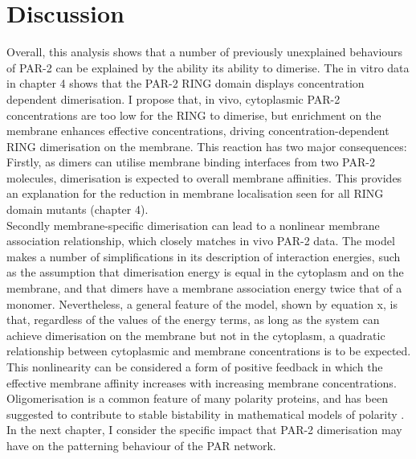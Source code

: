 \documentclass[12pt]{"report"}
\begin{document}
\section{Discussion}

Overall, this analysis shows that a number of previously unexplained behaviours of PAR-2 can be explained by the ability its ability to dimerise. The in vitro data in chapter 4 shows that the PAR-2 RING domain displays concentration dependent dimerisation. I propose that, in vivo, cytoplasmic PAR-2 concentrations are too low for the RING to dimerise, but enrichment on the membrane enhances effective concentrations, driving concentration-dependent RING dimerisation on the membrane. This reaction has two major consequences:\\

Firstly, as dimers can utilise membrane binding interfaces from two PAR-2 molecules, dimerisation is expected to overall membrane affinities. This provides an explanation for the reduction in membrane localisation seen for all RING domain mutants (chapter 4). \\

Secondly membrane-specific dimerisation can lead to a nonlinear membrane association relationship, which closely matches in vivo PAR-2 data. The model makes a number of simplifications in its description of interaction energies, such as the assumption that dimerisation energy is equal in the cytoplasm and on the membrane, and that dimers have a membrane association energy twice that of a monomer. Nevertheless, a general feature of the model, shown by equation x, is that, regardless of the values of the energy terms, as long as the system can achieve dimerisation on the membrane but not in the cytoplasm, a quadratic relationship between cytoplasmic and membrane concentrations is to be expected.\\

This nonlinearity can be considered a form of positive feedback in which the effective membrane affinity increases with increasing membrane concentrations. Oligomerisation is a common feature of many polarity proteins, and has been suggested to contribute to stable bistability in mathematical models of polarity \citep{Lang2022}. In the next chapter, I consider the specific impact that PAR-2 dimerisation may have on the patterning behaviour of the PAR network.\\

\end{document}
